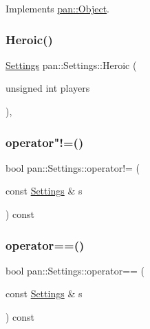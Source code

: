 Implements \hyperlink{classpan_1_1_object_a2bb6d3117bb32f5774657c83f118ed8b}{pan\+::\+Object}.

\mbox{\label{classpan_1_1_settings_af0212489163b1d55fc5e661ad85a0b1e}} 
\subsubsection{\texorpdfstring{Heroic()}{Heroic()}}
{\footnotesize\ttfamily \hyperlink{classpan_1_1_settings}{Settings} pan\+::\+Settings\+::\+Heroic (\begin{DoxyParamCaption}\item[{unsigned int}]{players }\end{DoxyParamCaption})\hspace{0.3cm}{\ttfamily [inline]}, {\ttfamily [static]}}

\mbox{\label{classpan_1_1_settings_a47b2bc896ccc1de8ab00f734555b4cdc}} 
\subsubsection{\texorpdfstring{operator"!=()}{operator!=()}}
{\footnotesize\ttfamily bool pan\+::\+Settings\+::operator!= (\begin{DoxyParamCaption}\item[{const \hyperlink{classpan_1_1_settings}{Settings} \&}]{s }\end{DoxyParamCaption}) const}

\mbox{\label{classpan_1_1_settings_a5a068817d5e6f48ac72b9f2706f185a8}} 
\subsubsection{\texorpdfstring{operator==()}{operator==()}}
{\footnotesize\ttfamily bool pan\+::\+Settings\+::operator== (\begin{DoxyParamCaption}\item[{const \hyperlink{classpan_1_1_settings}{Settings} \&}]{s }\end{DoxyParamCaption}) const}

